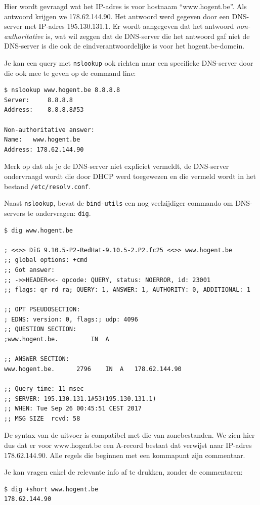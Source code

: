 Hier wordt gevraagd wat het IP-adres is voor hostnaam ``www.hogent.be''. Als antwoord krijgen we 178.62.144.90. Het antwoord werd gegeven door een DNS-server met IP-adres 195.130.131.1. Er wordt aangegeven dat het antwoord \emph{non-authoritative} is, wat wil zeggen dat de DNS-server die het antwoord gaf niet de DNS-server is die ook de eindverantwoordelijke is voor het hogent.be-domein.

Je kan een query met \texttt{nslookup} ook richten naar een specifieke DNS-server door die ook mee te geven op de command line:

\begin{verbatim}
$ nslookup www.hogent.be 8.8.8.8
Server:		8.8.8.8
Address:	8.8.8.8#53

Non-authoritative answer:
Name:	www.hogent.be
Address: 178.62.144.90
\end{verbatim}

Merk op dat als je de DNS-server niet expliciet vermeldt, de DNS-server ondervraagd wordt die door DHCP werd toegewezen en die vermeld wordt in het bestand \texttt{/etc/resolv.conf}.

Naast \texttt{nslookup}, bevat de \texttt{bind-utils} een nog veelzijdiger commando om DNS-servers te ondervragen: \texttt{dig}.

\begin{verbatim}
$ dig www.hogent.be

; <<>> DiG 9.10.5-P2-RedHat-9.10.5-2.P2.fc25 <<>> www.hogent.be
;; global options: +cmd
;; Got answer:
;; ->>HEADER<<- opcode: QUERY, status: NOERROR, id: 23001
;; flags: qr rd ra; QUERY: 1, ANSWER: 1, AUTHORITY: 0, ADDITIONAL: 1

;; OPT PSEUDOSECTION:
; EDNS: version: 0, flags:; udp: 4096
;; QUESTION SECTION:
;www.hogent.be.			IN	A

;; ANSWER SECTION:
www.hogent.be.		2796	IN	A	178.62.144.90

;; Query time: 11 msec
;; SERVER: 195.130.131.1#53(195.130.131.1)
;; WHEN: Tue Sep 26 00:45:51 CEST 2017
;; MSG SIZE  rcvd: 58
\end{verbatim}

De syntax van de uitvoer is compatibel met die van zonebestanden. We zien hier dus dat er voor www.hogent.be een A-record bestaat dat verwijst naar IP-adres 178.62.144.90. Alle regels die beginnen met een kommapunt zijn commentaar.

Je kan vragen enkel de relevante info af te drukken, zonder de commentaren:

\begin{verbatim}
$ dig +short www.hogent.be
178.62.144.90
\end{verbatim}


